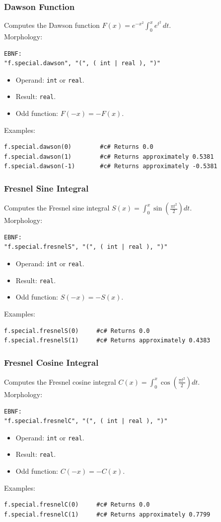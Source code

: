 \subsubsection{Dawson Function}
Computes the Dawson function $F(x) = e^{-x^2} \int_0^x e^{t^2}\,dt$. \\
Morphology:
\begin{verbatim}
EBNF:
"f.special.dawson", "(", ( int | real ), ")"
\end{verbatim}
\begin{itemize}
\item Operand: \texttt{int} or \texttt{real}.
\item Result: \texttt{real}.
\item Odd function: $F(-x) = -F(x)$.
\end{itemize}
Examples:
\begin{verbatim}
f.special.dawson(0)        #c# Returns 0.0
f.special.dawson(1)        #c# Returns approximately 0.5381
f.special.dawson(-1)       #c# Returns approximately -0.5381
\end{verbatim}

\subsubsection{Fresnel Sine Integral}
Computes the Fresnel sine integral $S(x) = \int_0^x \sin\!\left(\frac{\pi t^2}{2}\right) dt$. \\
Morphology:
\begin{verbatim}
EBNF:
"f.special.fresnelS", "(", ( int | real ), ")"
\end{verbatim}
\begin{itemize}
\item Operand: \texttt{int} or \texttt{real}.
\item Result: \texttt{real}.
\item Odd function: $S(-x) = -S(x)$.
\end{itemize}
Examples:
\begin{verbatim}
f.special.fresnelS(0)     #c# Returns 0.0
f.special.fresnelS(1)     #c# Returns approximately 0.4383
\end{verbatim}

\subsubsection{Fresnel Cosine Integral}
Computes the Fresnel cosine integral $C(x) = \int_0^x \cos\!\left(\frac{\pi t^2}{2}\right) dt$. \\
Morphology:
\begin{verbatim}
EBNF:
"f.special.fresnelC", "(", ( int | real ), ")"
\end{verbatim}
\begin{itemize}
\item Operand: \texttt{int} or \texttt{real}.
\item Result: \texttt{real}.
\item Odd function: $C(-x) = -C(x)$.
\end{itemize}
Examples:
\begin{verbatim}
f.special.fresnelC(0)     #c# Returns 0.0
f.special.fresnelC(1)     #c# Returns approximately 0.7799
\end{verbatim}

